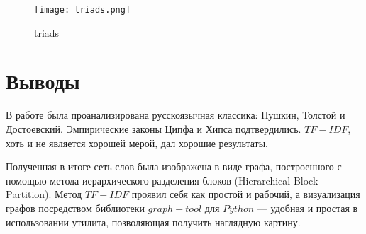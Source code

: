 \begin{sidewaystable}
  \centering
  \caption{Матрица весов графа биграмм и триад}
  \label{fig:matrix:triads:table}
\end{sidewaystable}

\begin{figure}[h]
  \centering
  \texttt{[image: triads.png]}
  \caption{triads}
  \label{fig:triads:graph}
\end{figure}

\clearpage

\chapter*{Выводы}

В работе была проанализирована русскоязычная классика:
Пушкин, Толстой и Достоевский.
Эмпирические законы Ципфа и Хипса подтвердились.
$TF-IDF$, хоть и не является хорошей мерой,
дал хорошие результаты.

Полученная в итоге сеть слов была изображена в виде графа, построенного
с помощью метода иерархического разделения блоков (Hierarchical Block Partition).
Метод $TF-IDF$ проявил себя как простой и рабочий,
а визуализация графов посредством библиотеки $graph-tool$ для $Python$ ---
удобная и простая в использовании утилита, позволяющая получить наглядную
картину.

\clearpage
{}
{}
\renewcommand\bibname{Список литературы}



